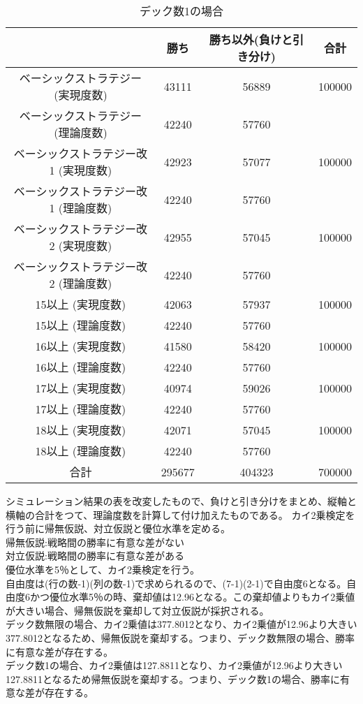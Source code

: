 \begin{table}[H]
 \begin{center}
  \begin{tabular}{|c|c|c|c|}
    \hline
      & 勝ち & 勝ち以外(負けと引き分け) & 合計 \\
    \hline ベーシックストラテジー (実現度数)& 43111 & 56889 & 100000 \\
             ベーシックストラテジー (理論度数)& 42240 & 57760 &  \\
    \hline ベーシックストラテジー改1 (実現度数)& 42923 & 57077 & 100000 \\
             ベーシックストラテジー改1 (理論度数)& 42240 & 57760 &  \\
    \hline ベーシックストラテジー改2 (実現度数)& 42955 & 57045 & 100000 \\
              ベーシックストラテジー改2 (理論度数)& 42240 & 57760 &  \\
    \hline 15以上 (実現度数)& 42063 & 57937 & 100000 \\
             15以上 (理論度数)& 42240 & 57760 & 　\\
    \hline 16以上 (実現度数)& 41580 & 58420 & 100000 \\
             16以上 (理論度数)& 42240 & 57760 & 　\\
    \hline 17以上 (実現度数)& 40974 & 59026 & 100000 \\
             17以上 (理論度数)& 42240 & 57760 & 　\\
    \hline 18以上 (実現度数)& 42071 & 57045 & 100000 \\
             18以上 (理論度数)& 42240 & 57760 & 　\\
    \hline  合計 & 295677 & 404323 & 700000 \\
    \hline
  \end{tabular}
 \end{center}
 \caption{デック数1の場合}
\end{table}
\clearpage
シミュレーション結果の表を改変したもので、負けと引き分けをまとめ、縦軸と横軸の合計をつて、理論度数を計算して付け加えたものである。
カイ2乗検定を行う前に帰無仮説、対立仮説と優位水準を定める。\\
帰無仮説:戦略間の勝率に有意な差がない\\
対立仮説:戦略間の勝率に有意な差がある\\
優位水準を5％として、カイ2乗検定を行う。\\
自由度は(行の数-1)(列の数-1)で求められるので、(7-1)(2-1)で自由度6となる。自由度6かつ優位水準5％の時、棄却値は12.96となる。この棄却値よりもカイ2乗値が大きい場合、帰無仮説を棄却して対立仮説が採択される。\\
デック数無限の場合、カイ2乗値は377.8012となり、カイ2乗値が12.96より大きい377.8012となるため、帰無仮説を棄却する。つまり、デック数無限の場合、勝率に有意な差が存在する。\\
デック数1の場合、カイ2乗値は127.8811となり、カイ2乗値が12.96より大きい127.8811となるため帰無仮説を棄却する。つまり、デック数1の場合、勝率に有意な差が存在する。
